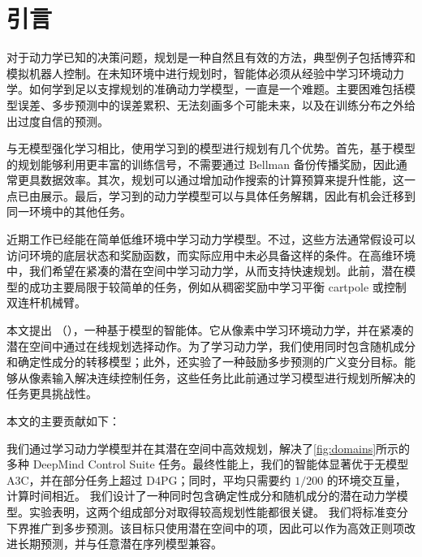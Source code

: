 \section{引言}
\label{introduction}

\afterpage{}

对于动力学已知的决策问题，规划是一种自然且有效的方法，典型例子包括博弈和模拟机器人控制\citep{tassa2012mpc,silver2017alphago,moravvcik2017deepstack}。在未知环境中进行规划时，智能体必须从经验中学习环境动力学。如何学到足以支撑规划的准确动力学模型，一直是一个难题。主要困难包括模型误差、多步预测中的误差累积、无法刻画多个可能未来，以及在训练分布之外给出过度自信的预测。

与无模型强化学习相比，使用学习到的模型进行规划有几个优势。首先，基于模型的规划能够利用更丰富的训练信号，不需要通过 Bellman 备份传播奖励，因此通常更具数据效率。其次，规划可以通过增加动作搜索的计算预算来提升性能，这一点已由\citet{silver2017alphago}展示。最后，学习到的动力学模型可以与具体任务解耦，因此有机会迁移到同一环境中的其他任务。

近期工作已经能在简单低维环境中学习动力学模型\citep{deisenroth2011pilco,gal2016deeppilco,amos2018awareness,chua2018pets,henaff2018planbybackprop}。不过，这些方法通常假设可以访问环境的底层状态和奖励函数，而实际应用中未必具备这样的条件。在高维环境中，我们希望在紧凑的潜在空间中学习动力学，从而支持快速规划。此前，潜在模型的成功主要局限于较简单的任务，例如从稠密奖励中学习平衡 cartpole 或控制双连杆机械臂\citep{watter2015e2c,banijamali2017rce}。

本文提出 \fullmethod（\method），一种基于模型的智能体。它从像素中学习环境动力学，并在紧凑的潜在空间中通过在线规划选择动作。为了学习动力学，我们使用同时包含随机成分和确定性成分的转移模型；此外，还实验了一种鼓励多步预测的广义变分目标。\method 能够从像素输入解决连续控制任务，这些任务比此前通过学习模型进行规划所解决的任务更具挑战性。

本文的主要贡献如下：
\begin{itemize}
我们通过学习动力学模型并在其潜在空间中高效规划，解决了\cref{fig:domains}所示的多种 DeepMind Control Suite 任务。最终性能上，我们的智能体显著优于无模型 A3C，并在部分任务上超过 D4PG；同时，平均只需要约 $1/200$ 的环境交互量，计算时间相近。
我们设计了一种同时包含确定性成分和随机成分的潜在动力学模型\citep{buesing2018dssm,chung2015vrnn}。实验表明，这两个组成部分对取得较高规划性能都很关键。
我们将标准变分下界推广到多步预测。该目标只使用潜在空间中的项，因此可以作为高效正则项改进长期预测，并与任意潜在序列模型兼容。
\end{itemize}
